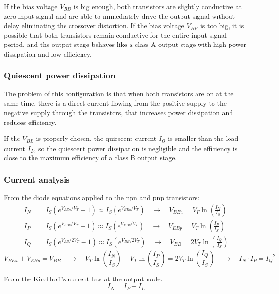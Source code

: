 If the bias voltage \(V_{BB}\) is big enough, both transistors are slightly conductive at zero input signal and are able
to immediately drive the output signal without delay eliminating the crossover distortion. If the bias voltage \(V_{BB}\)
is too big, it is possible that both transistors remain conductive for the entire input signal period, and the output stage
behaves like a class A output stage with high power dissipation and low efficiency.

\subsubsection*{Quiescent power dissipation}
The problem of this configuration is that when both transistors are on at the same time, there is a direct current flowing from
the positive supply to the negative supply through the transistors, that increases power dissipation and reduces efficiency.

If the \(V_{BB}\) is properly chosen, the quiescent current \(I_{Q}\) is smaller than the load current \(I_L\), so the quiescent
power dissipation is negligible and the efficiency is close to the maximum efficiency of a class B output stage.

\subsubsection*{Current analysis}
From the diode equations applied to the npn and pnp transistors:
\begin{align*}
	I_{N} &= I_S \left( e^{V_{BEn} / V_T} - 1 \right) \approx I_S \left( e^{V_{BEn} / V_T} \right) \quad \rightarrow \quad V_{BEn} = V_T \ln \left( \frac{I_N}{I_S} \right) \\
	I_{P} &= I_S \left( e^{V_{EBp} / V_T} - 1 \right) \approx I_S \left( e^{V_{EBp} / V_T} \right)\quad \rightarrow \quad V_{EBp} = V_T \ln \left( \frac{I_P}{I_S} \right) \\
	I_{Q} &= I_S \left( e^{V_{BB} / 2 V_T} - 1 \right) \approx I_S \left( e^{V_{BB} / 2 V_T} \right) \quad \rightarrow \quad V_{BB} = 2 V_T \ln \left( \frac{I_Q}{I_S} \right)
\end{align*}
\[V_{BEn} + V_{EBp} = V_{BB} \quad \rightarrow \quad V_T \ln \left( \frac{I_N}{I_S} \right) + V_T \ln \left( \frac{I_P}{I_S} \right) = 2 V_T \ln \left( \frac{I_Q}{I_S} \right) \quad \rightarrow \quad I_N \cdot I_P = {I_Q}^2\]

From the Kirchhoff's current law at the output node: \[I_N = I_P + I_L\]

